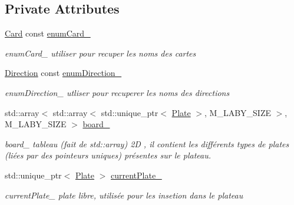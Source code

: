 \subsection*{Private Attributes}
\begin{DoxyCompactItemize}
\item 
\mbox{\label{class_board_a3888ede548a7e4702f328c27859868f9}} 
\mbox{\hyperlink{class_card}{Card}} const \mbox{\hyperlink{class_board_a3888ede548a7e4702f328c27859868f9}{enum\+Card\+\_\+}}
\begin{DoxyCompactList}\small\item\em enum\+Card\+\_\+ utiliser pour recuper les noms des cartes \end{DoxyCompactList}\item 
\mbox{\label{class_board_a1d2bd4f0383c5cb36ff2b521b66fd32a}} 
\mbox{\hyperlink{class_direction}{Direction}} const \mbox{\hyperlink{class_board_a1d2bd4f0383c5cb36ff2b521b66fd32a}{enum\+Direction\+\_\+}}
\begin{DoxyCompactList}\small\item\em enum\+Direction\+\_\+ utliser pour recuperer les noms des directions \end{DoxyCompactList}\item 
\mbox{\label{class_board_ac3f86695326ff95548ef60a97564ff42}} 
std\+::array$<$ std\+::array$<$ std\+::unique\+\_\+ptr$<$ \mbox{\hyperlink{class_plate}{Plate}} $>$, M\+\_\+\+L\+A\+B\+Y\+\_\+\+S\+I\+ZE $>$, M\+\_\+\+L\+A\+B\+Y\+\_\+\+S\+I\+ZE $>$ \mbox{\hyperlink{class_board_ac3f86695326ff95548ef60a97564ff42}{board\+\_\+}}
\begin{DoxyCompactList}\small\item\em board\+\_\+ tableau (fait de std\+::array) 2D , il contient les différents types de plates (liées par des pointeurs uniques) présentes sur le plateau. \end{DoxyCompactList}\item 
\mbox{\label{class_board_a3d026b42947838bfb5bf532f4457230e}} 
std\+::unique\+\_\+ptr$<$ \mbox{\hyperlink{class_plate}{Plate}} $>$ \mbox{\hyperlink{class_board_a3d026b42947838bfb5bf532f4457230e}{current\+Plate\+\_\+}}
\begin{DoxyCompactList}\small\item\em current\+Plate\+\_\+ plate libre, utilisée pour les insetion dans le plateau \end{DoxyCompactList}\end{DoxyCompactItemize}


